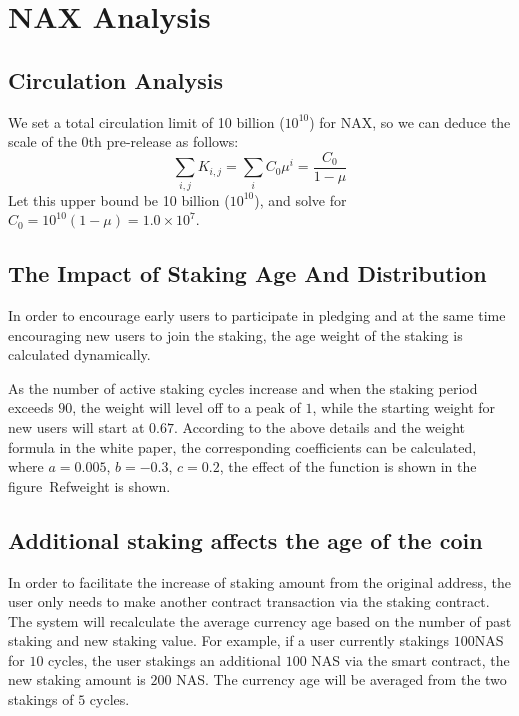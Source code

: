 \section{NAX Analysis}
\subsection{Circulation Analysis}
We set a total circulation limit of 10 billion (\(10^{10}\)) for NAX, so we can deduce the scale of the 0th pre-release as follows:
\begin{equation}
  \sum_{i,j} K_{i,j} = \sum_i C_0 \mu^i = \frac{C_0}{1-\mu}
\end{equation}
  Let this upper bound be 10 billion (\(10^{10}\)), and solve for \(C_0 = 10^{10}(1-\mu) = 1.0\times10^7\).

\subsection{The Impact of Staking Age And Distribution}
In order to encourage early users to participate in pledging and at the same time encouraging new users to join the staking, the age weight of the staking is calculated dynamically. 

As the number of active staking cycles increase and when the staking period exceeds $90$, the weight will level off to a peak of $1$, while the starting weight for new users will start at $0.67$. According to the above details and the weight formula in the white paper, the corresponding coefficients can be calculated, where \(a=0.005\), \(b=-0.3\), \(c=0.2\), the effect of the function is shown in the figure\ Ref{weight} is shown.

\subsection{Additional staking affects the age of the coin}
In order to facilitate the increase of staking amount from the original address, the user only needs to make another contract transaction via the staking contract. The system will recalculate the average currency age based on the number of past staking and new staking value. For example, if a user currently stakings $100$NAS for $10$ cycles, the user stakings an additional $100$ NAS via the smart contract, the new staking amount is $200$ NAS. The currency age will be averaged from the two stakings of $5$ cycles.
